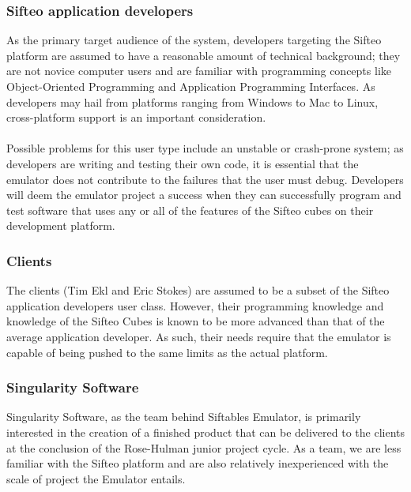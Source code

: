 \documentclass[12pt]{article}
\begin{document}
                          \subsubsection{Sifteo application developers}
                          As the primary target audience of the system, developers targeting the Sifteo platform are assumed to have a reasonable amount of technical background; they are not novice computer users and are familiar with programming concepts like Object-Oriented Programming and Application Programming Interfaces. As developers may hail from platforms ranging from Windows to Mac to Linux, cross-platform support is an important consideration.\\\\
                          Possible problems for this user type include an unstable or crash-prone system; as developers are writing and testing their own code, it is essential that the emulator does not contribute to the failures that the user must debug. Developers will deem the emulator project a success when they can successfully program and test software that uses any or all of the features of the Sifteo cubes on their development platform.

                          \subsubsection{Clients}
                          The clients (Tim Ekl and Eric Stokes) are assumed to be a subset of the Sifteo application developers user class. However, their programming knowledge and knowledge of the Sifteo Cubes is known to be more advanced than that of the average application developer. As such, their needs require that the emulator is capable of being pushed to the same limits as the actual platform.

                          \subsubsection{Singularity Software}
                          Singularity Software, as the team behind Siftables Emulator, is primarily interested in the creation of a finished product that can be delivered to the clients at the conclusion of the Rose-Hulman junior project cycle. As a team, we are less familiar with the Sifteo platform and are also relatively inexperienced with the scale of project the Emulator entails.
\end{document}

